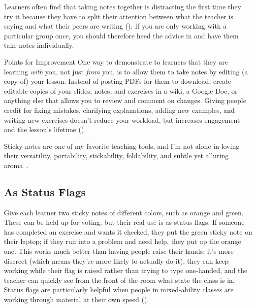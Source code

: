 Learners often find that taking notes together is distracting
the first time they try it
because they have to split their attention between
what the teacher is saying
and what their peers are writing ().
If you are only working with a particular group once,
you should therefore heed the advice in 
and have them take notes individually.

\begin{aside}{Points for Improvement}
  One way to demonstrate to learners that they are learning \emph{with} you,
  not just \emph{from} you,
  is to allow them to take notes by editing (a copy of) your lesson.
  Instead of posting PDFs for them to download,
  create editable copies of your slides, notes, and exercises
  in a wiki,
  a Google Doc,
  or anything else that allows you to review and comment on changes.
  Giving people credit for fixing mistakes,
  clarifying explanations,
  adding new examples,
  and writing new exercises doesn't reduce your workload,
  but increases engagement and the lesson's lifetime
  ().
\end{aside}


Sticky notes are one of my favorite teaching tools,
and I'm not alone in loving their versatility,
portability, stickability, foldability,
and subtle yet alluring aroma~\cite{Ward2015}.

\subsection*{As Status Flags}

Give each learner two sticky notes of different colors,
such as orange and green.
These can be held up for voting,
but their real use is as status flags.
If someone has completed an exercise and wants it checked,
they put the green sticky note on their laptop;
if they run into a problem and need help,
they put up the orange one.
This works much better than having people raise their hands:
it's more discreet (which means they're more likely to actually do it),
they can keep working while their flag is raised rather than trying to type one-handed,
and the teacher can quickly see from the front of the room what state the class is in.
Status flags are particularly helpful when people in mixed-ability classes
are working through material at their own speed ().

